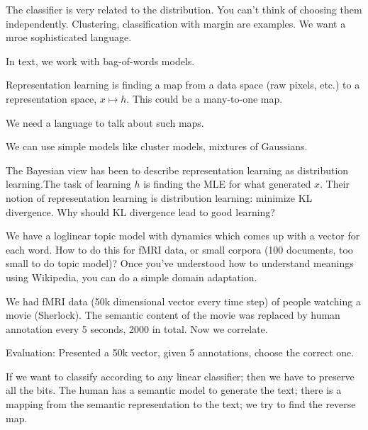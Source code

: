 \begin{enumerate}
The classifier is very related to the distribution. You can't think of choosing them independently. Clustering, classification with margin are examples. %
We want a mroe sophisticated language.

In text, we work with bag-of-words models. 
\end{enumerate}

Representation learning is finding a map from a data space (raw pixels, etc.) to a representation space, $x\mapsto h$. This could be a many-to-one map. 

We need a language to talk about such maps. 

We can use simple models like cluster models, mixtures of Gaussians. %


The Bayesian view has been to describe representation learning as distribution learning.The task of learning $h$ is finding the MLE for what generated $x$. Their notion of representation learning is distribution learning: minimize KL divergence. Why should KL divergence lead to good learning?

We have a loglinear topic model with dynamics which comes up with a vector for each word. How to do this for fMRI data, or small corpora (100 documents, too small to do topic model)? Once you've understood how to understand meanings using Wikipedia, you can do a simple domain adaptation.

We had fMRI data (50k dimensional vector every time step) of people watching a movie (Sherlock). The semantic content of the movie was replaced by human annotation every 5 seconds, 2000 in total. Now we correlate.

Evaluation: Presented a 50k vector, given 5 annotations, choose the correct one.


If we want to classify according to any linear classifier; then we have to preserve all the bits. %
The human has a semantic model to generate the text; there is a mapping from the semantic representation to the text; we try to find the reverse map.


